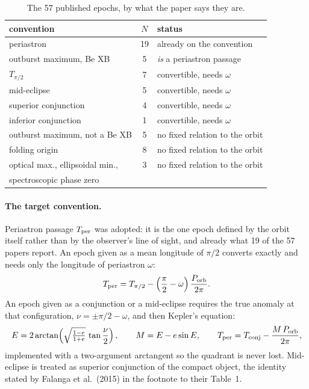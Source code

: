 \documentclass[10pt,a4paper]{article}
\begin{document}
\begin{table}[t]
\centering
\footnotesize
\caption{The 57 published epochs, by what the paper says they are.}
\label{tab:t0}
\begin{tabular}{lcl}
\toprule
convention & $N$ & status \\
\midrule
periastron & 19 & already on the convention \\
outburst maximum, Be XB & 5 & \emph{is} a periastron passage \\
$T_{\pi/2}$ & 7 & convertible, needs $\omega$ \\
mid-eclipse & 5 & convertible, needs $\omega$ \\
superior conjunction & 4 & convertible, needs $\omega$ \\
inferior conjunction & 1 & convertible, needs $\omega$ \\
outburst maximum, not a Be XB & 5 & no fixed relation to the orbit \\
folding origin & 8 & no fixed relation to the orbit \\
optical max., ellipsoidal min., & 3 & no fixed relation to the orbit \\
spectroscopic phase zero & & \\
\bottomrule
\end{tabular}
\end{table}

\paragraph{The target convention.} Periastron passage $T_{\rm per}$ was adopted:
it is the one epoch defined by the orbit itself rather than by the observer's
line of sight, and already what 19 of the 57 papers report. An epoch given as a
mean longitude of $\pi/2$ converts exactly and needs only the longitude of
periastron $\omega$:
\begin{equation}
T_{\rm per}=T_{\pi/2}-\left(\frac{\pi}{2}-\omega\right)\frac{P_{\rm orb}}{2\pi}.
\label{eq:tpi2}
\end{equation}
An epoch given as a conjunction or a mid-eclipse requires the true anomaly at
that configuration, $\nu=\pm\pi/2-\omega$, and then Kepler's equation:
\begin{equation}
E = 2\arctan\!\left(\sqrt{\tfrac{1-e}{1+e}}\,\tan\frac{\nu}{2}\right),
\qquad M = E-e\sin E,
\qquad T_{\rm per} = T_{\rm conj}-\frac{M\,P_{\rm orb}}{2\pi},
\label{eq:kepler}
\end{equation}
implemented with a two-argument arctangent so the quadrant is never lost.
Mid-eclipse is treated as superior conjunction of the compact object, the
identity stated by Falanga et al.\ (2015) in the footnote to their Table~1.
\end{document}
